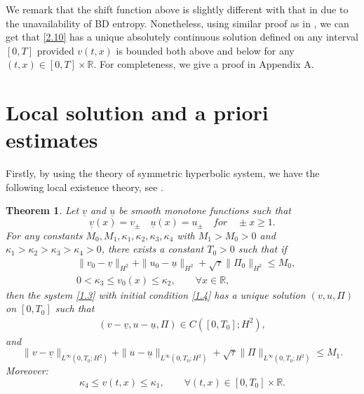 \documentclass[10pt,reqno]{amsart}
\numberwithin{equation}{section}
\newtheorem{theorem}{Theorem}[section]
\begin{document}
We remark that the shift function above is slightly different with that in \cite{SMJ} due to the unavailability of BD entropy. Nonetheless, using similar proof as in \cite{SMJ}, we can get that \eqref{2.10} has a unique absolutely continuous solution defined on any interval $[0,T]$ provided  $v(t,x)$ is bounded both above and below for any $(t,x)\in[0,T]\times \mathbb{R}$. For completeness, we give a  proof in Appendix A.

\section{Local solution and a priori estimates}

Firstly, by using the theory of symmetric hyperbolic system, we have the following local existence theory, see \cite{JR, WY, MV20, TA}.
\begin{theorem}\label{th3.1}
Let $\underline{v}$ and $\underline{u}$ be smooth monotone functions such that
\[
\underline{v}(x)=v_{\pm} \quad \underline{u}(x)=u_{\pm} \quad for \quad \pm x\geq1.
\]
For any constants $M_0,M_1,\kappa_1,\kappa_2,\kappa_3,\kappa_4$ with $M_1>M_0>0$ and $\kappa_1>\kappa_2>\kappa_3>\kappa_4>0$, there exists a constant $T_0>0$ such that if
\[
\begin{aligned}
&\|v_0-\underline{v}\|_{H^2}+\|u_0-\underline{u}\|_{H^2}+\sqrt{\tau}\|\Pi_0\|_{H^2}\leq M_0,\\
&0<\kappa_3\leq v_0(x)\leq\kappa_2,\qquad \forall x\in\mathbb{R},
\end{aligned}
\]
then the system \eqref{1.3} with initial condition \eqref{1.4} has a unique solution $(v, u, \Pi)$ on $[0,T_0]$ such that
\[
\begin{aligned}
(v-\underline{v}, u-\underline{u}, \Pi)\in C([0,T_0];H^2),
\end{aligned}
\]
and
\[
\|v-\underline{v}\|_{L^{\infty}(0,T_0;H^2)}+\|u-\underline{u}\|_{L^{\infty}(0,T_0;H^2)}
+\sqrt{\tau}\|\Pi\|_{L^{\infty}(0,T_0;H^2)}\leq M_1.
\]
Moreover:
\[
\kappa_4\leq v(t,x)\leq\kappa_1,\qquad \forall(t,x)\in[0,T_0]\times\mathbb{R}.
\]
\end{theorem}
\end{document}

